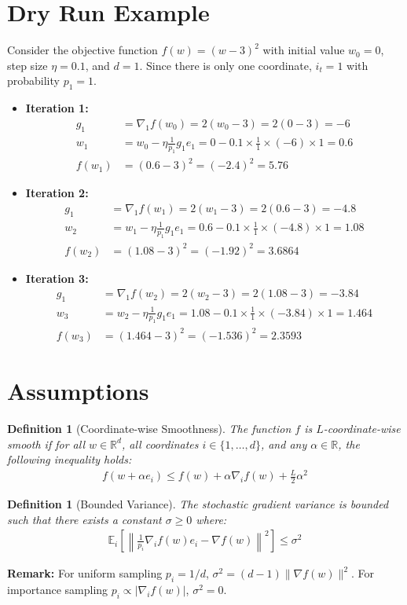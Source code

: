 \documentclass{article}
\newtheorem{definition}[theorem]{Definition}
\begin{document}
\section*{Dry Run Example}
Consider the objective function $f(w) = (w-3)^2$ with initial value $w_0 = 0$, step size $\eta = 0.1$, and $d=1$. Since there is only one coordinate, $i_t = 1$ with probability $p_1 = 1$.
\begin{itemize}
    \item \textbf{Iteration 1:}
    \begin{align*}
        g_1 &= \nabla_1 f(w_0) = 2(w_0 - 3) = 2(0 - 3) = -6 \\
        w_1 &= w_0 - \eta \frac{1}{p_1} g_1 e_1 = 0 - 0.1 \times \frac{1}{1} \times (-6) \times 1 = 0.6 \\
        f(w_1) &= (0.6 - 3)^2 = (-2.4)^2 = 5.76
    \end{align*}
    \item \textbf{Iteration 2:}
    \begin{align*}
        g_1 &= \nabla_1 f(w_1) = 2(w_1 - 3) = 2(0.6 - 3) = -4.8 \\
        w_2 &= w_1 - \eta \frac{1}{p_1} g_1 e_1 = 0.6 - 0.1 \times \frac{1}{1} \times (-4.8) \times 1 = 1.08 \\
        f(w_2) &= (1.08 - 3)^2 = (-1.92)^2 = 3.6864
    \end{align*}
    \item \textbf{Iteration 3:}
    \begin{align*}
        g_1 &= \nabla_1 f(w_2) = 2(w_2 - 3) = 2(1.08 - 3) = -3.84 \\
        w_3 &= w_2 - \eta \frac{1}{p_1} g_1 e_1 = 1.08 - 0.1 \times \frac{1}{1} \times (-3.84) \times 1 = 1.464 \\
        f(w_3) &= (1.464 - 3)^2 = (-1.536)^2 = 2.3593
    \end{align*}
\end{itemize}

\section*{Assumptions}
\begin{definition}[Coordinate-wise Smoothness]
The function $f$ is $L$-coordinate-wise smooth if for all $w \in \mathbb{R}^d$, all coordinates $i \in \{1, \dots, d\}$, and any $\alpha \in \mathbb{R}$, the following inequality holds:
\begin{align*}
    f(w + \alpha e_i) \leq f(w) + \alpha \nabla_i f(w) + \frac{L}{2} \alpha^2
\end{align*}
\end{definition}
\begin{definition}[Bounded Variance]
The stochastic gradient variance is bounded such that there exists a constant $\sigma \geq 0$ where:
\begin{align*}
    \mathbb{E}_{i} \left[ \left\| \frac{1}{p_i} \nabla_i f(w) e_i - \nabla f(w) \right\|^2 \right] \leq \sigma^2
\end{align*}
\end{definition}
\textbf{Remark:} For uniform sampling $p_i = 1/d$, $\sigma^2 = (d-1)\|\nabla f(w)\|^2$. For importance sampling $p_i \propto |\nabla_i f(w)|$, $\sigma^2 = 0$.
\end{document}

